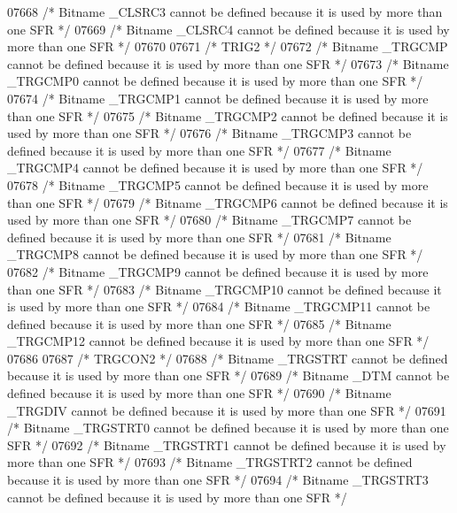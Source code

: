 \begin{DoxyCode}
07668 \textcolor{comment}{/* Bitname \_CLSRC3 cannot be defined because it is used by more than one SFR */}
07669 \textcolor{comment}{/* Bitname \_CLSRC4 cannot be defined because it is used by more than one SFR */}
07670 
07671 \textcolor{comment}{/* TRIG2 */}
07672 \textcolor{comment}{/* Bitname \_TRGCMP cannot be defined because it is used by more than one SFR */}
07673 \textcolor{comment}{/* Bitname \_TRGCMP0 cannot be defined because it is used by more than one SFR */}
07674 \textcolor{comment}{/* Bitname \_TRGCMP1 cannot be defined because it is used by more than one SFR */}
07675 \textcolor{comment}{/* Bitname \_TRGCMP2 cannot be defined because it is used by more than one SFR */}
07676 \textcolor{comment}{/* Bitname \_TRGCMP3 cannot be defined because it is used by more than one SFR */}
07677 \textcolor{comment}{/* Bitname \_TRGCMP4 cannot be defined because it is used by more than one SFR */}
07678 \textcolor{comment}{/* Bitname \_TRGCMP5 cannot be defined because it is used by more than one SFR */}
07679 \textcolor{comment}{/* Bitname \_TRGCMP6 cannot be defined because it is used by more than one SFR */}
07680 \textcolor{comment}{/* Bitname \_TRGCMP7 cannot be defined because it is used by more than one SFR */}
07681 \textcolor{comment}{/* Bitname \_TRGCMP8 cannot be defined because it is used by more than one SFR */}
07682 \textcolor{comment}{/* Bitname \_TRGCMP9 cannot be defined because it is used by more than one SFR */}
07683 \textcolor{comment}{/* Bitname \_TRGCMP10 cannot be defined because it is used by more than one SFR */}
07684 \textcolor{comment}{/* Bitname \_TRGCMP11 cannot be defined because it is used by more than one SFR */}
07685 \textcolor{comment}{/* Bitname \_TRGCMP12 cannot be defined because it is used by more than one SFR */}
07686 
07687 \textcolor{comment}{/* TRGCON2 */}
07688 \textcolor{comment}{/* Bitname \_TRGSTRT cannot be defined because it is used by more than one SFR */}
07689 \textcolor{comment}{/* Bitname \_DTM cannot be defined because it is used by more than one SFR */}
07690 \textcolor{comment}{/* Bitname \_TRGDIV cannot be defined because it is used by more than one SFR */}
07691 \textcolor{comment}{/* Bitname \_TRGSTRT0 cannot be defined because it is used by more than one SFR */}
07692 \textcolor{comment}{/* Bitname \_TRGSTRT1 cannot be defined because it is used by more than one SFR */}
07693 \textcolor{comment}{/* Bitname \_TRGSTRT2 cannot be defined because it is used by more than one SFR */}
07694 \textcolor{comment}{/* Bitname \_TRGSTRT3 cannot be defined because it is used by more than one SFR */}

\end{DoxyCode}
